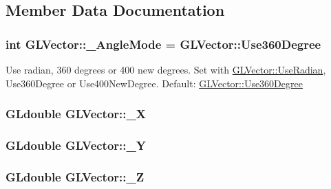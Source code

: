 \subsection{\-Member \-Data \-Documentation}
\hypertarget{classGLVector_a7bbb126b09ba6c37cc010528ae913ce3}{
\subsubsection[{\-\_\-\-Angle\-Mode}]{\setlength{\rightskip}{0pt plus 5cm}int {\bf \-G\-L\-Vector\-::\-\_\-\-Angle\-Mode} = {\bf \-G\-L\-Vector\-::\-Use360\-Degree}}}
\label{d4/db1/classGLVector_a7bbb126b09ba6c37cc010528ae913ce3}
\-Use radian, 360 degrees or 400 new degrees. \-Set with \hyperlink{classGLVector_a8b1fc370c56a13540109b9b6f3d4f5df}{\-G\-L\-Vector\-::\-Use\-Radian}, \-Use360\-Degree or \-Use400\-New\-Degree. \-Default\-: \hyperlink{classGLVector_abb139fb8951c3eda14b0eb7d74c0504e}{\-G\-L\-Vector\-::\-Use360\-Degree} \hypertarget{classGLVector_a9450f309bf0b64245937f36606a3489f}{
\subsubsection[{\-\_\-\-X}]{\setlength{\rightskip}{0pt plus 5cm}\-G\-Ldouble {\bf \-G\-L\-Vector\-::\-\_\-\-X}}}
\label{d4/db1/classGLVector_a9450f309bf0b64245937f36606a3489f}
\hypertarget{classGLVector_a638c2f737d3fce449d64e5aae5b15aa8}{
\subsubsection[{\-\_\-\-Y}]{\setlength{\rightskip}{0pt plus 5cm}\-G\-Ldouble {\bf \-G\-L\-Vector\-::\-\_\-\-Y}}}
\label{d4/db1/classGLVector_a638c2f737d3fce449d64e5aae5b15aa8}
\hypertarget{classGLVector_a95097d48b78403b59733b95ac857656a}{
\subsubsection[{\-\_\-\-Z}]{\setlength{\rightskip}{0pt plus 5cm}\-G\-Ldouble {\bf \-G\-L\-Vector\-::\-\_\-\-Z}}}
